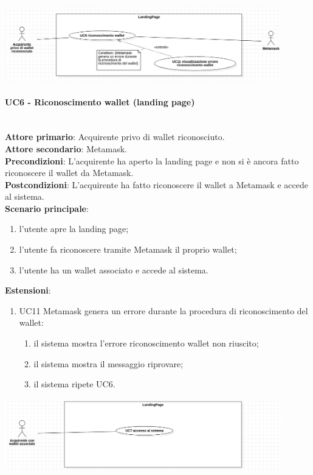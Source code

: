 \documentclass[a4paper, 12pt]{article}
\begin{document}
\includegraphics[width=0.9\textwidth]{UseCase_landing_page1}

\paragraph{UC6 - Riconoscimento wallet (landing page)}\\
\textbf{Attore primario}: Acquirente privo di wallet riconosciuto.\\
\textbf{Attore secondario}: Metamask.\\
\textbf{Precondizioni}: L'acquirente ha aperto la landing page e non si è ancora fatto riconoscere il wallet da Metamask.\\
\textbf{Postcondizioni}: L'acquirente ha fatto riconoscere il wallet a Metamask e accede al sistema.\\
\textbf{Scenario principale}:
\begin{enumerate}
    \item l’utente apre la landing page;
    \item l’utente fa riconoscere tramite Metamask il proprio wallet;
    \item l’utente ha un wallet associato e accede al sistema.
\end{enumerate}
\textbf{Estensioni}:
\begin{enumerate}
    \item UC11 Metamask genera un errore durante la procedura di riconoscimento del wallet:
    \begin{enumerate}
        \item il sistema mostra l'errore riconoscimento wallet non riuscito;
        \item il sistema mostra il messaggio riprovare;
        \item il sistema ripete UC6.
    \end{enumerate}
\end{enumerate}

\includegraphics[width=0.9\textwidth]{UseCase_landing_page2}
\end{document}

